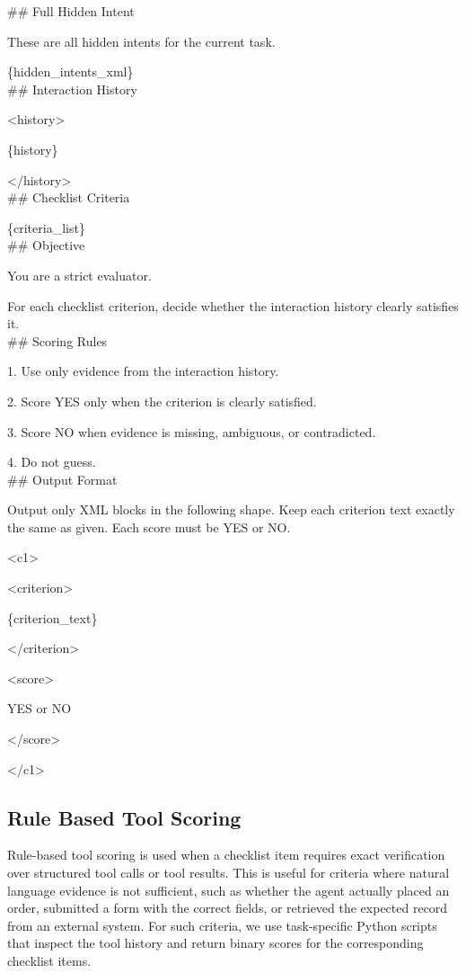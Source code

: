 \documentclass{llmxive}
\providecommand{\tcolorboxPrompt}[2]{\begin{tcolorbox}[
    title=#1,
    colback=cyan!3, 
    colframe=blue!50!black!60,
    rounded corners,
    sharp corners=northeast,
    sharp corners=southwest,
    width=1.00\linewidth,
    boxsep=2pt,
    top=2pt,
    bottom=2pt,
    enhanced,
    breakable,
    before=\setlength{\parindent}{0pt},
]

#2
\end{tcolorbox}
}
\providecommand{\tcolorboxPromptEvaluationPromptCommonText}{\fontsize{7.5}{9}\selectfont}
\providecommand{\tcolorboxPromptEvaluationPromptCommonTextLineSkip}{\setlength{\baselineskip}{5 pt}}
\begin{document}
\tcolorboxPrompt{Prompt -- Checklist-based Rubric Evaluation
}{
\ttfamily
\#\# Full Hidden Intent

These are all hidden intents for the current task.

\{hidden\_intents\_xml\} \\

\#\# Interaction History

<history>

\{history\}

</history> \\

\#\# Checklist Criteria

\{criteria\_list\} \\

\#\# Objective

You are a strict evaluator.

For each checklist criterion, decide whether the interaction history clearly satisfies it.\\

\#\# Scoring Rules

1. Use only evidence from the interaction history.

2. Score YES only when the criterion is clearly satisfied.

3. Score NO when evidence is missing, ambiguous, or contradicted.

4. Do not guess.\\

\#\# Output Format

Output only XML blocks in the following shape. Keep each criterion text exactly the same as given. Each score must be YES or NO.

<c1>

<criterion>

\{criterion\_text\}

</criterion>

<score>

YES or NO

</score>

</c1>
}

\subsection{Rule Based Tool Scoring}
\label{app:eval_rule_based}

Rule-based tool scoring is used when a checklist item requires exact verification over structured tool calls or tool results. This is useful for criteria where natural language evidence is not sufficient, such as whether the agent actually placed an order, submitted a form with the correct fields, or retrieved the expected record from an external system. For such criteria, we use task-specific Python scripts that inspect the tool history and return binary scores for the corresponding checklist items.
\end{document}
